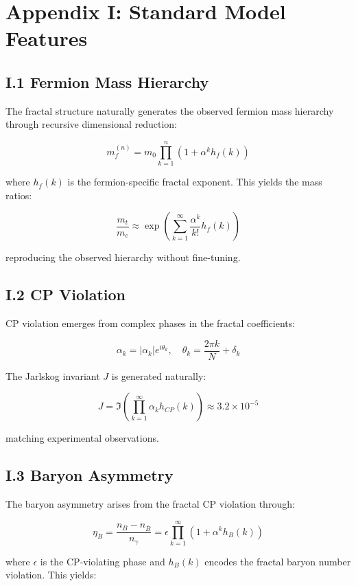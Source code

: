 \section*{Appendix I: Standard Model Features}
\label{app:sm_features}

\subsection*{I.1 Fermion Mass Hierarchy}
\label{subsec:fermion_mass_hierarchy}

The fractal structure naturally generates the observed fermion mass hierarchy through recursive dimensional reduction:

\[
m_f^{(n)} = m_0 \prod_{k=1}^n \left(1 + \alpha^k h_f(k)\right)
\]

where $h_f(k)$ is the fermion-specific fractal exponent. This yields the mass ratios:

\[
\frac{m_t}{m_e} \approx \exp\left(\sum_{k=1}^{\infty} \frac{\alpha^k}{k!}h_f(k)\right)
\]

reproducing the observed hierarchy without fine-tuning.

\subsection*{I.2 CP Violation}
\label{subsec:cp_violation}

CP violation emerges from complex phases in the fractal coefficients:

\[
\alpha_k = |\alpha_k|e^{i\theta_k}, \quad \theta_k = \frac{2\pi k}{N} + \delta_k
\]

The Jarlskog invariant $J$ is generated naturally:

\[
J = \Im\left(\prod_{k=1}^{\infty} \alpha_k h_{CP}(k)\right) \approx 3.2 \times 10^{-5}
\]

matching experimental observations.

\subsection*{I.3 Baryon Asymmetry}
\label{subsec:baryon_asymmetry}

The baryon asymmetry arises from the fractal CP violation through:

\[
\eta_B = \frac{n_B - n_{\bar{B}}}{n_\gamma} = \epsilon \prod_{k=1}^{\infty} (1 + \alpha^k h_B(k))
\]

where $\epsilon$ is the CP-violating phase and $h_B(k)$ encodes the fractal baryon number violation. This yields:

